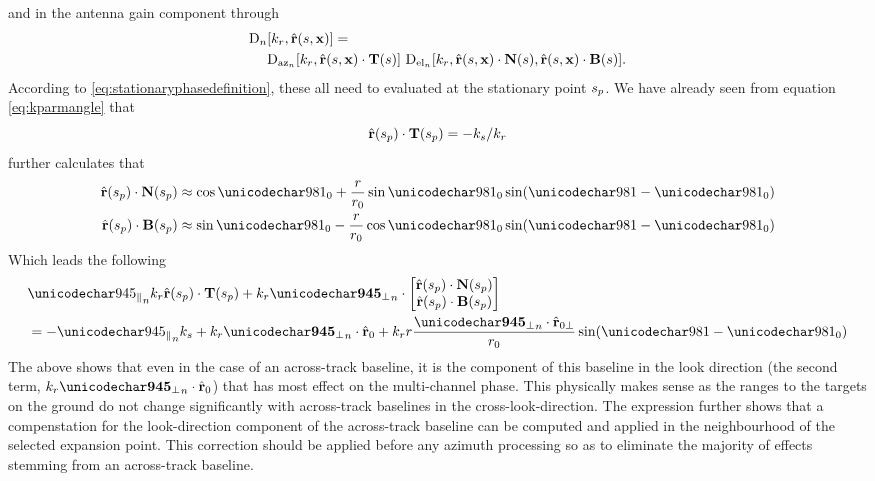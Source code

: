 and in the antenna gain component through
\begin{equation}
\begin{split}
 \text{D}_{n}&[k_r, \hat{\mathbf{r}}(s, \mathbf{\mathbf{x}})] =\\ &\text{D}_{\text{az}_{n}}[k_r, \hat{\mathbf{r}}(s, \mathbf{\mathbf{x}})\cdot\mathbf{T}(s)] \ \text{D}_{\text{el}_{n}}[k_r, \hat{\mathbf{r}}(s, \mathbf{\mathbf{x}})\cdot\mathbf{N}(s), \hat{\mathbf{r}}(s, \mathbf{\mathbf{x}})\cdot\mathbf{B}(s)].
 \end{split}
\end{equation}
According to \eqref{eq:stationaryphasedefinition}, these all need to evaluated at the stationary point $s_p$. We have already seen from equation \eqref{eq:kparmangle} that
\begin{equation}
 \hat{\mathbf{r}}(s_p)\cdot\mathbf{T}(s_p) = -k_{s}/k_r
\end{equation}
 further calculates that
\begin{align}
 \vhat{\range}(\stationaryparm)\cdot\vct{N}(\stationaryparm) &\approx \cos\targetdepressionz + \frac{\targetrange}{\targetrangez}\sin\targetdepressionz\sin(\targetdepression-\targetdepressionz)\\
 \vhat{\range}(\stationaryparm)\cdot\vct{B}(\stationaryparm) &\approx \sin\targetdepressionz - \frac{\targetrange}{\targetrangez}\cos\targetdepressionz\sin(\targetdepression-\targetdepressionz)
\end{align}
Which leads the following
\begin{equation}
 \begin{split}
  &\alongtrack\kr\vhat{\range}(\stationaryparm)\cdot\vct{T}(\stationaryparm) + \kr\acrosstrack\cdot\begin{bmatrix}\vhat{\range}(\stationaryparm)\cdot\vct{N}(\stationaryparm)\\ \vhat{\range}(\stationaryparm)\cdot\vct{B}(\stationaryparm)\end{bmatrix}\\
  &=-\alongtrack\kparm+\kr\acrosstrack\cdot\uRangeVectorParmZero+\kr\targetrange\frac{\acrosstrack\cdot\uRangeVectorParmZeroPerp}{\targetrangez}\sin(\targetdepression-\targetdepressionz)
 \end{split}
\end{equation}
The above shows that even in the case of an across-track baseline, it is the component of this baseline in the look direction (the second term, $\kr\acrosstrack\cdot\uRangeVectorParmZero$) that has most effect on the multi-channel phase. This physically makes sense as the ranges to the targets on the ground do not change significantly with across-track baselines in the cross-look-direction. The expression further shows that a compenstation for the look-direction component of the across-track baseline can be computed and applied in the neighbourhood of the selected expansion point. This correction should be applied before any azimuth processing so as to eliminate the majority of effects stemming from an across-track baseline.
